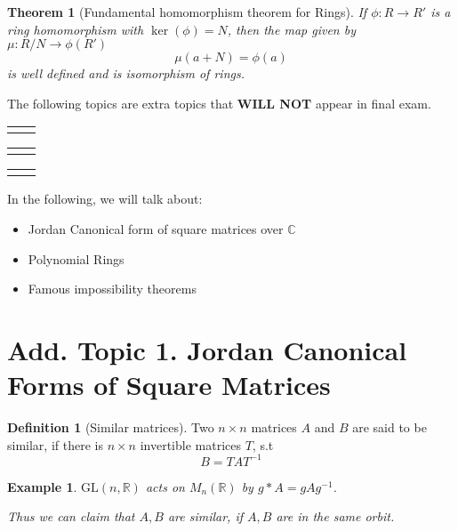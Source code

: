 \documentclass{article}
\theoremstyle{MyNonumberplain}
\theoremstyle{break}
\newcommand{\nline}{\begin{tabular}{ll}&\\\end{tabular}}
\newcommand{\tmop}{\text}
\theoremstyle{break}
\newtheorem{theorem}{Theorem}[section]
\newtheorem{example}{Example}[section]
\theoremstyle{break}
\theoremstyle{definition}
\theoremstyle{break}
\newtheorem{definition}{Definition}[section]
\begin{document}
\begin{thmbox}
    \begin{theorem}[Fundamental homomorphism theorem for Rings]
        If $\phi : R \rightarrow R'$ is a ring homomorphism with $\ker (\phi) = N$,
        then the map given by $\mu : R / N \rightarrow \phi (R')$
        \[ \mu (a + N) = \phi (a) \]
        is well defined and is isomorphism of rings. 
    \end{theorem}
\end{thmbox}

\newpage


\begin{center}
    \vspace*{\fill}
        The following topics are extra topics that \textbf{WILL NOT} appear in final exam.

        \nline
        \nline
        \nline

        In the following, we will talk about:
        \begin{itemize}
        \item Jordan Canonical form of square matrices over $\mathbb{C}$

        \item Polynomial Rings

        \item Famous impossibility theorems
        \end{itemize}
    \vspace*{\fill}
\end{center}


\newpage

\section{Add. Topic 1. Jordan Canonical Forms of Square Matrices}
\begin{defbox}
    \begin{definition}[Similar matrices]
        Two $n \times n$ matrices $A$ and $B$ are said to be similar, if there is $n
        \times n$ invertible matrices $T$, s.t
        \[ B = T A T^{- 1} \]
    \end{definition}
\end{defbox}

\begin{expbox}
    \begin{example}
        $\tmop{GL} (n, \mathbb{R})$ acts on $M_n (\mathbb{R})$ by $g \ast A = g A g^{-
        1}$.
        
        Thus we can claim that $A, B$ are similar, if $A, B$ are in the same orbit.
    \end{example}
\end{expbox}
\end{document}
